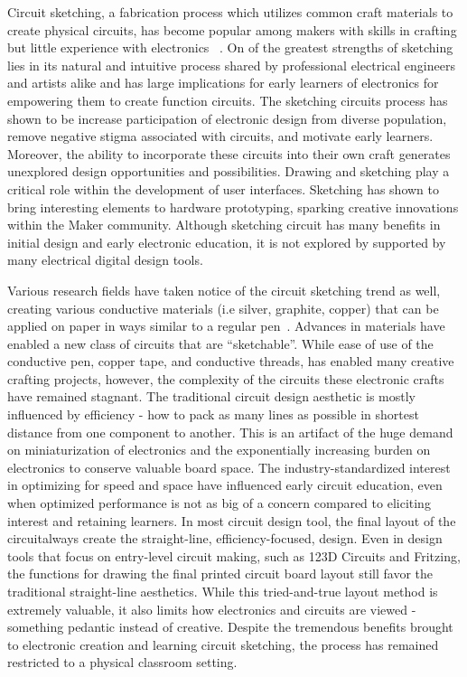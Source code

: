 \documentclass{sigchi}
\begin{document}
Circuit sketching, a fabrication process which utilizes common craft materials to create physical circuits, has become popular among makers with skills in crafting but little experience with electronics ~\cite{qi_sketching_2014, qi_stickers_2015}.
On of the greatest strengths of sketching lies in its natural and intuitive process shared by professional electrical engineers and artists alike and has large implications for early learners of electronics for empowering them to create function circuits. The sketching circuits process has shown to be increase participation of electronic design from diverse population, remove negative stigma associated with circuits, and motivate early learners. Moreover, the ability to incorporate these circuits into their own craft generates unexplored design opportunities and possibilities. 
Drawing and sketching play a critical role within the development of user interfaces. Sketching has shown to bring interesting elements to hardware prototyping, sparking creative innovations within the Maker community.
Although sketching circuit has many benefits in initial design and early electronic education, it is not explored by supported by many electrical digital design tools.


Various research fields have taken notice of the circuit sketching trend as well, creating various conductive materials (i.e silver, graphite, copper) that can be applied on paper in ways similar to a regular pen~\cite{russo2011pen}. Advances in materials have enabled a new class of circuits that are ``sketchable''. While ease of use of the conductive pen, copper tape, and conductive threads, has enabled many creative crafting projects, however, the complexity of the circuits these electronic crafts have remained stagnant. The traditional circuit design aesthetic is mostly influenced by efficiency - how to pack as many lines as possible in shortest distance from one component to another. This is an artifact of the huge demand on miniaturization of electronics and the exponentially increasing burden on electronics to conserve valuable board space. The industry-standardized interest in optimizing for speed and space have influenced early circuit education, even when optimized performance is not as big of a concern compared to eliciting interest and retaining learners.
In most circuit design tool, the final layout of the circuitalways create the straight-line, efficiency-focused, design.
Even in design tools that focus on entry-level circuit making, such as 123D Circuits and Fritzing, the functions for drawing the final printed circuit board layout still favor the traditional straight-line aesthetics.
While this tried-and-true layout method is extremely valuable, it also limits how electronics and circuits are viewed - something pedantic instead of creative. Despite the tremendous benefits brought to electronic creation and learning circuit sketching, the process has remained restricted to a physical classroom setting.
\end{document}
